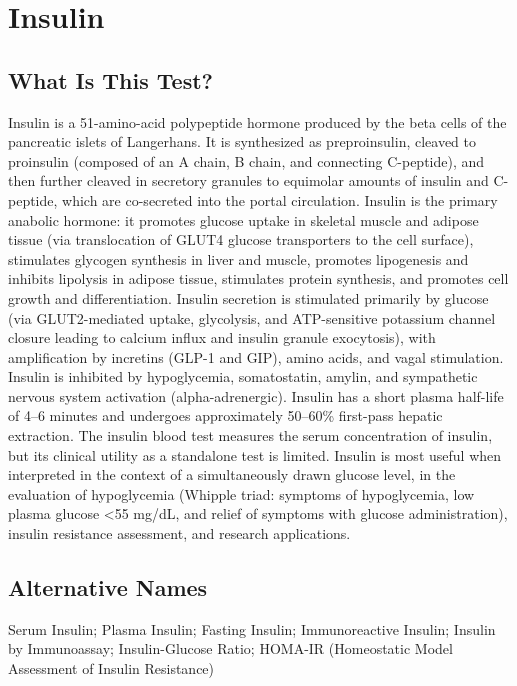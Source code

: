 \chapter{Insulin}

\section*{What Is This Test?}
Insulin is a 51-amino-acid polypeptide hormone produced by the beta cells of the pancreatic islets of Langerhans. It is synthesized as preproinsulin, cleaved to proinsulin (composed of an A chain, B chain, and connecting C-peptide), and then further cleaved in secretory granules to equimolar amounts of insulin and C-peptide, which are co-secreted into the portal circulation. Insulin is the primary anabolic hormone: it promotes glucose uptake in skeletal muscle and adipose tissue (via translocation of GLUT4 glucose transporters to the cell surface), stimulates glycogen synthesis in liver and muscle, promotes lipogenesis and inhibits lipolysis in adipose tissue, stimulates protein synthesis, and promotes cell growth and differentiation. Insulin secretion is stimulated primarily by glucose (via GLUT2-mediated uptake, glycolysis, and ATP-sensitive potassium channel closure leading to calcium influx and insulin granule exocytosis), with amplification by incretins (GLP-1 and GIP), amino acids, and vagal stimulation. Insulin is inhibited by hypoglycemia, somatostatin, amylin, and sympathetic nervous system activation (alpha-adrenergic). Insulin has a short plasma half-life of 4--6 minutes and undergoes approximately 50--60\% first-pass hepatic extraction. The insulin blood test measures the serum concentration of insulin, but its clinical utility as a standalone test is limited. Insulin is most useful when interpreted in the context of a simultaneously drawn glucose level, in the evaluation of hypoglycemia (Whipple triad: symptoms of hypoglycemia, low plasma glucose <55 mg/dL, and relief of symptoms with glucose administration), insulin resistance assessment, and research applications.

\section*{Alternative Names}
Serum Insulin; Plasma Insulin; Fasting Insulin; Immunoreactive Insulin; Insulin by Immunoassay; Insulin-Glucose Ratio; HOMA-IR (Homeostatic Model Assessment of Insulin Resistance)

